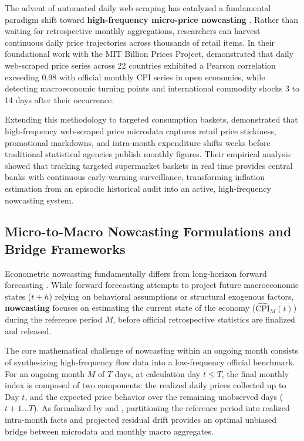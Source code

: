 \hs The advent of automated daily web scraping has catalyzed a fundamental paradigm shift toward \textbf{high-frequency micro-price nowcasting} \citep{cavallo2016billion}. Rather than waiting for retrospective monthly aggregations, researchers can harvest continuous daily price trajectories across thousands of retail items. In their foundational work with the MIT Billion Prices Project, \cite{cavallo2016billion} demonstrated that daily web-scraped price series across 22 countries exhibited a Pearson correlation exceeding $0.98$ with official monthly CPI series in open economies, while detecting macroeconomic turning points and international commodity shocks 3 to 14 days after their occurrence.

\hs Extending this methodology to targeted consumption baskets, \cite{aparicio2021targeted} demonstrated that high-frequency web-scraped price microdata captures retail price stickiness, promotional markdowns, and intra-month expenditure shifts weeks before traditional statistical agencies publish monthly figures. Their empirical analysis showed that tracking targeted supermarket baskets in real time provides central banks with continuous early-warning surveillance, transforming inflation estimation from an episodic historical audit into an active, high-frequency nowcasting system.

\subsection{Micro-to-Macro Nowcasting Formulations and Bridge Frameworks}
\hs Econometric nowcasting fundamentally differs from long-horizon forward forecasting \citep{babii2022machine}. While forward forecasting attempts to project future macroeconomic states ($t+h$) relying on behavioral assumptions or structural exogenous factors, \textbf{nowcasting} focuses on estimating the current state of the economy ($\widehat{\text{CPI}}_M(t)$) during the reference period $M$, before official retrospective statistics are finalized and released.

\hs The core mathematical challenge of nowcasting within an ongoing month consists of synthesizing high-frequency flow data into a low-frequency official benchmark. For an ongoing month $M$ of $T$ days, at calculation day $t \le T$, the final monthly index is composed of two components: the realized daily prices collected up to Day $t$, and the expected price behavior over the remaining unobserved days ($t+1 \dots T$). As formalized by \cite{macias2023nowcasting} and \cite{babii2022machine}, partitioning the reference period into realized intra-month facts and projected residual drift provides an optimal unbiased bridge between microdata and monthly macro aggregates.

